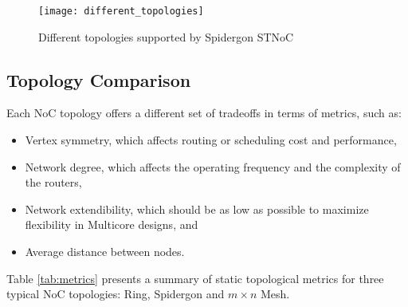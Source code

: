	\begin{figure}[ht]
	\centering
		\texttt{[image: different\_topologies]}
		\caption{Different topologies supported by Spidergon STNoC}
		\label{fig:different_topologies}
	\end{figure}

\subsection{Topology Comparison}\label{S:metrics}

Each NoC topology offers a different set of tradeoffs in terms of metrics, such as:
\begin{itemize}
\item Vertex symmetry, which affects routing or scheduling cost and performance,
\item Network degree, which affects the operating frequency and the complexity of the routers,
\item Network extendibility, which should be as low as possible to maximize flexibility in Multicore designs, and 
\item Average distance between nodes.
\end{itemize}

Table \ref{tab:metrics} presents a summary of static topological metrics for three typical NoC topologies: Ring, Spidergon and ${m \times n}$ Mesh.

